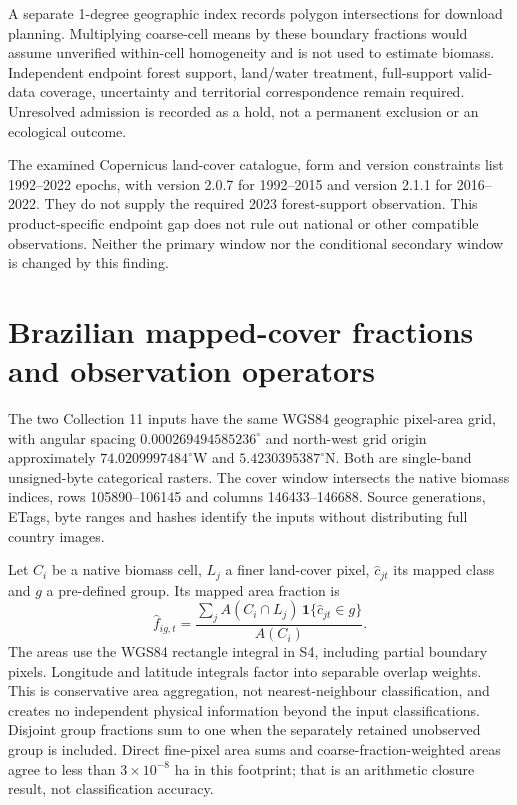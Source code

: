 \documentclass[11pt,a4paper]{article}
\begin{document}
A separate 1-degree geographic index records polygon intersections for download planning. Multiplying coarse-cell means by these boundary fractions would assume unverified within-cell homogeneity and is not used to estimate biomass. Independent endpoint forest support, land/water treatment, full-support valid-data coverage, uncertainty and territorial correspondence remain required. Unresolved admission is recorded as a hold, not a permanent exclusion or an ecological outcome.

The examined Copernicus land-cover catalogue, form and version constraints list 1992--2022 epochs, with version 2.0.7 for 1992--2015 and version 2.1.1 for 2016--2022. They do not supply the required 2023 forest-support observation. This product-specific endpoint gap does not rule out national or other compatible observations. Neither the primary window nor the conditional secondary window is changed by this finding.

\section{Brazilian mapped-cover fractions and observation operators}

The two Collection 11 inputs have the same WGS84 geographic pixel-area grid, with angular spacing $0.000269494585236^\circ$ and north-west grid origin approximately $74.0209997484^\circ$W and $5.4230395387^\circ$N. Both are single-band unsigned-byte categorical rasters. The cover window intersects the native biomass indices, rows 105890--106145 and columns 146433--146688. Source generations, ETags, byte ranges and hashes identify the inputs without distributing full country images.

Let $C_i$ be a native biomass cell, $L_j$ a finer land-cover pixel, $\widehat c_{jt}$ its mapped class and $g$ a pre-defined group. Its mapped area fraction is
\begin{equation}
\widehat f_{ig,t}=\frac{\sum_j A(C_i\cap L_j)\,\mathbf1\{\widehat c_{jt}\in g\}}{A(C_i)}.
\end{equation}
The areas use the WGS84 rectangle integral in S4, including partial boundary pixels. Longitude and latitude integrals factor into separable overlap weights. This is conservative area aggregation, not nearest-neighbour classification, and creates no independent physical information beyond the input classifications. Disjoint group fractions sum to one when the separately retained unobserved group is included. Direct fine-pixel area sums and coarse-fraction-weighted areas agree to less than $3\times10^{-8}$ ha in this footprint; that is an arithmetic closure result, not classification accuracy.
\end{document}
